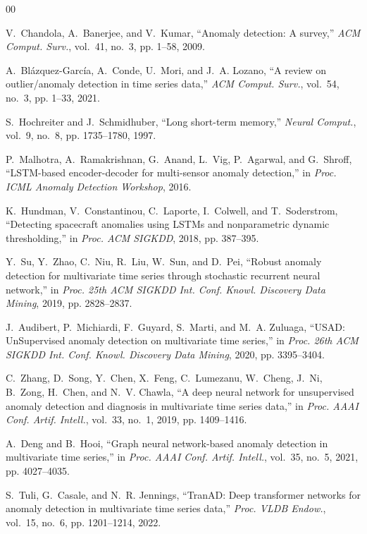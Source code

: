 \documentclass[conference]{IEEEtran}
\begin{document}
\begin{thebibliography}{00}

V.~Chandola, A.~Banerjee, and V.~Kumar, ``Anomaly detection: A survey,''
\emph{ACM Comput. Surv.}, vol.~41, no.~3, pp. 1--58, 2009.

A.~Bl\'{a}zquez-Garc\'{i}a, A.~Conde, U.~Mori, and J.~A. Lozano, ``A review on
outlier/anomaly detection in time series data,'' \emph{ACM Comput. Surv.},
vol.~54, no.~3, pp. 1--33, 2021.

S.~Hochreiter and J.~Schmidhuber, ``Long short-term memory,'' \emph{Neural
Comput.}, vol.~9, no.~8, pp. 1735--1780, 1997.

P.~Malhotra, A.~Ramakrishnan, G.~Anand, L.~Vig, P.~Agarwal, and G.~Shroff,
``LSTM-based encoder-decoder for multi-sensor anomaly detection,'' in
\emph{Proc. ICML Anomaly Detection Workshop}, 2016.

K.~Hundman, V.~Constantinou, C.~Laporte, I.~Colwell, and T.~Soderstrom,
``Detecting spacecraft anomalies using LSTMs and nonparametric dynamic
thresholding,'' in \emph{Proc. ACM SIGKDD}, 2018, pp. 387--395.

Y.~Su, Y.~Zhao, C.~Niu, R.~Liu, W.~Sun, and D.~Pei, ``Robust anomaly detection
for multivariate time series through stochastic recurrent neural network,'' in
\emph{Proc. 25th ACM SIGKDD Int. Conf. Knowl. Discovery Data Mining}, 2019,
pp. 2828--2837.

J.~Audibert, P.~Michiardi, F.~Guyard, S.~Marti, and M.~A. Zuluaga, ``USAD:
UnSupervised anomaly detection on multivariate time series,'' in \emph{Proc.
26th ACM SIGKDD Int. Conf. Knowl. Discovery Data Mining}, 2020,
pp. 3395--3404.

C.~Zhang, D.~Song, Y.~Chen, X.~Feng, C.~Lumezanu, W.~Cheng, J.~Ni, B.~Zong,
H.~Chen, and N.~V. Chawla, ``A deep neural network for unsupervised anomaly
detection and diagnosis in multivariate time series data,'' in \emph{Proc.
AAAI Conf. Artif. Intell.}, vol.~33, no.~1, 2019, pp. 1409--1416.

A.~Deng and B.~Hooi, ``Graph neural network-based anomaly detection in
multivariate time series,'' in \emph{Proc. AAAI Conf. Artif. Intell.},
vol.~35, no.~5, 2021, pp. 4027--4035.

S.~Tuli, G.~Casale, and N.~R. Jennings, ``TranAD: Deep transformer networks
for anomaly detection in multivariate time series data,'' \emph{Proc. VLDB
Endow.}, vol.~15, no.~6, pp. 1201--1214, 2022.


\end{thebibliography}
\end{document}
